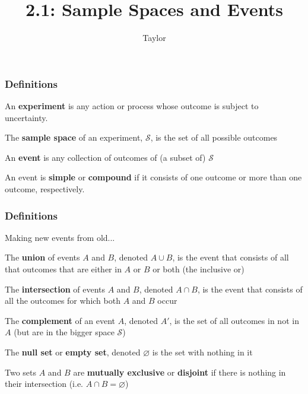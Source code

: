 \documentclass{beamer}
\title["2.1"]{2.1: Sample Spaces and Events}
\author{Taylor}
\institute[UVA] 
{
University of Virginia \\
\medskip
\textit{} 
}
\date{}
\begin{document}

\begin{frame}
\titlepage 
\end{frame}

\begin{frame}
\frametitle{Definitions}

An \textbf{experiment} is any action or process whose outcome is subject to uncertainty.
\newline

The \textbf{sample space} of an experiment, $\mathcal{S}$, is the set of all possible outcomes
\newline

An \textbf{event} is any collection of outcomes of (a subset of) $\mathcal{S}$ 
\newline

An event is \textbf{simple} or \textbf{compound} if it consists of one outcome or more than one outcome, respectively.
\newline

\end{frame}


\begin{frame}
\frametitle{Definitions}

Making new events from old...
\newline

The \textbf{union} of events $A$ and $B$, denoted $A \cup B$, is the event that consists of all that outcomes that are either in $A$ or $B$ or both (the inclusive or)
\newline

The \textbf{intersection} of events $A$ and $B$, denoted $A \cap B$, is the event that consists of all the outcomes for which both $A$ and $B$ occur
\newline

The \textbf{complement} of an event $A$, denoted $A'$, is the set of all outcomes in not in $A$ (but are in the bigger space $\mathcal{S}$) 
\newline

The \textbf{null set} or \textbf{empty set}, denoted $\varnothing$ is the set with nothing in it 
\newline

Two sets $A$ and $B$ are \textbf{mutually exclusive} or \textbf{disjoint} if there is nothing in their intersection (i.e. $A \cap B = \varnothing$)


\end{frame}
\end{document}
